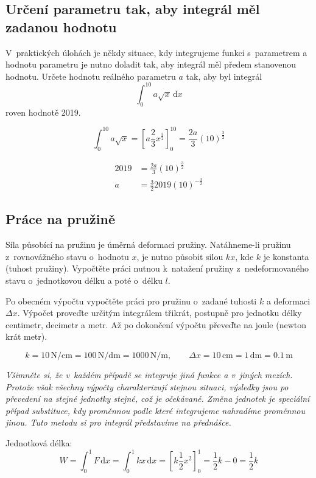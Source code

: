 \subsection{Určení parametru tak, aby integrál měl zadanou hodnotu}
V praktických úlohách je někdy situace, kdy integrujeme funkci s parametrem a hodnotu parametru je nutno doladit tak, aby integrál měl
předem stanovenou hodnotu.  Určete hodnotu reálného parametru $a$ tak,
aby byl integrál $$\int_0^{10} a \sqrt x\,\mathrm dx$$ roven hodnotě
2019.

\reseni

$$\int _0^{10} a\sqrt x=\left[a\frac 23 x^{\frac 32}\right]_0^{10}=\frac {2a}{3}(10)^{\frac 32}$$

$$\begin{aligned}
  2019&=\frac {2a}{3}(10)^{\frac 32}\\
  a&=\frac 32 2019 (10)^{-\frac 32}\end{aligned}$$

\konec

\stranka

\subsection{Práce na pružině} Síla působící na pružinu je úměrná
deformaci pružiny. Natáhneme-li pružinu z rovnovážného stavu o hodnotu
$x$, je nutno působit silou $kx$, kde $k$ je konstanta (tuhost
pružiny). Vypočtěte práci nutnou k natažení pružiny z nedeformovaného
stavu o jednotkovou délku a poté o délku $l$.

Po obecném výpočtu vypočtěte práci pro pružinu o zadané tuhosti $k$ a
deformaci $\Delta x$. Výpočet proveďte určitým integrálem třikrát,
postupně pro jednotku délky centimetr, decimetr a metr. Až po
dokončení výpočtu převeďte na joule (newton krát metr).

$$k=10 \,\mathrm{N}/\mathrm{cm}=100 \,\mathrm{N}/\mathrm{dm}=1000 \,\mathrm{N}/\mathrm{m}, \qquad \Delta x=10\,\mathrm{cm}=1\,\mathrm{dm}=0.1\,\mathrm{m}$$

\textit{Všimněte si, že v každém případě se integruje jiná funkce a v jiných
mezích. Protože však všechny výpočty charakterizují stejnou situaci,
výsledky jsou po převedení na stejné jednotky stejné, což je
očekávané. 
Změna jednotek je speciální případ substituce, kdy proměnnou podle
které integrujeme nahradíme proměnnou jinou. Tuto metodu si pro
integrál představíme na přednášce.
}

\reseni

Jednotková délka:
$$W=\int_0^1 F\,\mathrm dx = \int_0^1 kx\,\mathrm dx = \left[k\frac 12 x^2\right]_0^1=\frac 12 k-0=\frac 12 k$$

